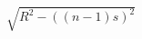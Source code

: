 \documentclass[preview]{standalone}
\begin{document}
\begin{align*}
\sqrt{R^2 - ((n-1)s)^2}
\end{align*}
\end{document}

